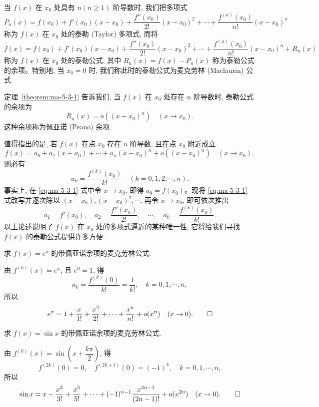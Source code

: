 \begin{remark}\label{remark:ma-5-source-64}
当 $f(x)$ 在 $x_0$ 处具有 $n(n\geqslant1)$ 阶导数时, 我们把多项式
\[
  P_n(x)=f(x_0)+f'(x_0)(x-x_0)+\frac{f''(x_0)}{2!}(x-x_0)^2
  +\cdots+\frac{f^{(n)}(x_0)}{n!}(x-x_0)^n
\]
称为 $f(x)$ 在 $x_0$ 处的泰勒 (Taylor) 多项式, 而将
\[
  f(x)=f(x_0)+f'(x_0)(x-x_0)+\frac{f''(x_0)}{2!}(x-x_0)^2
  +\cdots+\frac{f^{(n)}(x_0)}{n!}(x-x_0)^n+R_n(x)
\]
称为 $f(x)$ 在 $x_0$ 处的泰勒公式, 其中 $R_n(x)=f(x)-P_n(x)$ 称为泰勒公式的余项。特别地, 当 $x_0=0$ 时, 我们称此时的泰勒公式为麦克劳林 (Maclaurin) 公式.
\end{remark}

定理~\ref{theorem:ma-5-3-1} 告诉我们, 当 $f(x)$ 在 $x_0$ 处存在 $n$ 阶导数时, 泰勒公式的余项为
\[
  R_n(x)=o((x-x_0)^n)\quad (x\to x_0).
\]
这种余项称为佩亚诺 (Peano) 余项.

值得指出的是, 若 $f(x)$ 在点 $x_0$ 存在 $n$ 阶导数, 且在点 $x_0$ 附近成立
\begin{equation}
  f(x)=a_0+a_1(x-x_0)+\cdots+a_n(x-x_0)^n+o((x-x_0)^n)\quad (x\to x_0),
  \label{eq:ma-5-3-1}
\end{equation}
则必有
\[
  a_k=\frac{f^{(k)}(x_0)}{k!}\quad (k=0,1,2,\cdots,n).
\]
事实上, 在 \eqref{eq:ma-5-3-1} 式中令 $x\to x_0$, 即得 $a_0=f(x_0)$。现将 \eqref{eq:ma-5-3-1} 式改写并逐次除以 $(x-x_0),(x-x_0)^2,\cdots$, 再令 $x\to x_0$, 即可依次推出
\[
  a_1=f'(x_0),\quad a_2=\frac{f''(x_0)}{2!},\quad \cdots,\quad
  a_k=\frac{f^{(k)}(x_0)}{k!}.
\]
以上论述说明了 $f(x)$ 在 $x_0$ 处的多项式逼近的某种唯一性, 它将给我们寻找 $f(x)$ 的泰勒公式提供许多方便.

\begin{example}\label{example:ma-5-3-1}
求 $f(x)=e^x$ 的带佩亚诺余项的麦克劳林公式.
\end{example}


\begin{solve}
由 $f^{(k)}(x)=e^x$, 且 $e^0=1$, 得
\[
  a_k=\frac{f^{(k)}(0)}{k!}=\frac1{k!},\quad k=0,1,\cdots,n,
\]
所以
\[
  e^x=1+\frac{x}{1!}+\frac{x^2}{2!}+\cdots+\frac{x^n}{n!}+o(x^n)\quad (x\to0).
\qedhere
\]
\end{solve}


\begin{example}\label{example:ma-5-3-2}
求 $f(x)=\sin x$ 的带佩亚诺余项的麦克劳林公式.
\end{example}


\begin{solve}
由 $f^{(k)}(x)=\sin\left(x+\dfrac{k\pi}{2}\right)$, 得
\[
  f^{(2k)}(0)=0,\quad f^{(2k+1)}(0)=(-1)^k,\quad k=0,1,\cdots,n,
\]
所以
\[
  \sin x=x-\frac{x^3}{3!}+\frac{x^5}{5!}+\cdots+(-1)^{n-1}\frac{x^{2n-1}}{(2n-1)!}+o(x^{2n})\quad (x\to0).
\qedhere
\]
\end{solve}


